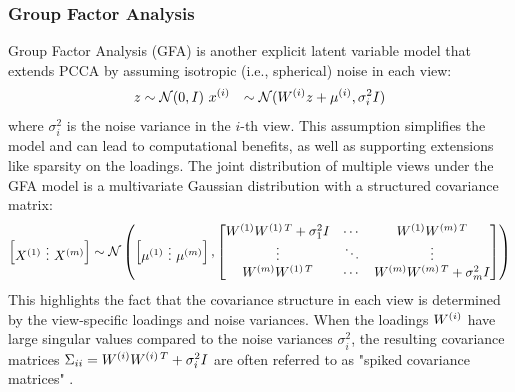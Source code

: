 \subsubsection{Group Factor Analysis}
Group Factor Analysis (GFA) \citep{klami2014group} is another explicit latent variable model that extends PCCA by assuming isotropic (i.e., spherical) noise in each view:
\begin{align}
z &\sim \mathcal{N}(0, I)\
x^{(i)} &\sim \mathcal{N}(W^{(i)} z + \mu^{(i)}, \sigma_i^2 I)
\end{align}
where $\sigma_i^2$ is the noise variance in the $i$-th view. This assumption simplifies the model and can lead to computational benefits, as well as supporting extensions like sparsity on the loadings.
The joint distribution of multiple views under the GFA model is a multivariate Gaussian distribution with a structured covariance matrix:
\begin{align}
\begin{bmatrix}
X^{(1)} \ \vdots \ X^{(m)}
\end{bmatrix} \sim \mathcal{N} \left( \begin{bmatrix}
\mu^{(1)} \ \vdots \ \mu^{(m)}
\end{bmatrix}, \begin{bmatrix}
W^{(1)}W^{(1)\,T} + \sigma_1^2 I & \cdots & W^{(1)}W^{(m)\,T} \\
\vdots & \ddots & \vdots \\
W^{(m)}W^{(1)\,T} & \cdots & W^{(m)}W^{(m)\,T} + \sigma_m^2 I
\end{bmatrix} \right)
\end{align}
This highlights the fact that the covariance structure in each view is determined by the view-specific loadings and noise variances. When the loadings $W^{(i)}$ have large singular values compared to the noise variances $\sigma_i^2$, the resulting covariance matrices $\Sigma_{ii} = W^{(i)}W^{(i)\,T} + \sigma_i^2 I$ are often referred to as "spiked covariance matrices" \citep{johnstone2001distribution}.

